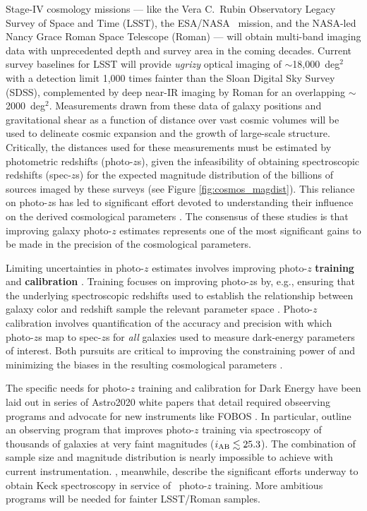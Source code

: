 \documentclass[11pt,a4paper,twoside,onecolumn,openany,final,oldfontcommands]{memoir}
\begin{document}
Stage-IV cosmology missions --- like the Vera C.~Rubin Observatory Legacy Survey of Space and Time (LSST), the ESA/NASA \euclid\ mission, and the NASA-led Nancy Grace Roman Space Telescope (Roman) --- will obtain multi-band imaging data with unprecedented depth and survey area in the coming decades.  Current survey baselines for LSST will provide \textit{ugrizy} optical imaging of $\sim$18,000~deg$^{2}$ with a detection limit 1,000 times fainter than the Sloan Digital Sky Survey (SDSS), complemented by deep near-IR imaging by Roman for an overlapping $\sim$2000~deg$^{2}$.  Measurements drawn from these data of galaxy positions and gravitational shear as a function of distance over vast cosmic volumes will be used to delineate cosmic expansion and the growth of large-scale structure. Critically, the distances used for these measurements must be estimated by photometric redshifts (photo-$z$s), given the infeasibility of obtaining spectroscopic redshifts (spec-$z$s) for the expected magnitude distribution of the billions of sources imaged by these surveys (see Figure \ref{fig:cosmos_magdist}).  This reliance on photo-$z$s has led to significant effort devoted to understanding their influence on the derived cosmological parameters \citep{huterer06, hearin10, newman15, LSSTDESCSRD}.  The consensus of these studies is that improving galaxy photo-$z$ estimates represents one of the most significant gains to be made in the precision of the cosmological parameters.

Limiting uncertainties in photo-$z$ estimates involves improving photo-$z$ \textbf{training} and \textbf{calibration} \citep{newman15}.  Training focuses on improving photo-$z$s by, e.g., ensuring that the underlying spectroscopic redshifts used to establish the relationship between galaxy color and redshift sample the relevant parameter space \citep{masters15, hemmati18}.  Photo-$z$ calibration involves quantification of the accuracy and precision with which photo-$z$s map to spec-$z$s for \textit{all} galaxies used to measure dark-energy parameters of interest.  Both pursuits are critical to improving the constraining power of and minimizing the biases in the resulting cosmological parameters \citep{LSSTDESCSRD}.

The specific needs for photo-$z$ training and calibration for Dark Energy have been laid out in series of Astro2020 white papers that detail required obseerving programs and advocate for new instruments like FOBOS \citep{newman19, hlovek19, mandelbaum19}.  In particular, \citet{newman15, newman19} outline an observing program that improves photo-$z$ training via spectroscopy of thousands of galaxies at very faint magnitudes ($i_{\rm AB} \lesssim 25.3$).  The combination of sample size and magnitude distribution is nearly impossible to achieve with current instrumentation.  \citep{masters19}, meanwhile, describe the significant efforts underway to obtain Keck spectroscopy in service of \euclid\ photo-$z$ training.  More ambitious programs will be needed for fainter LSST/Roman samples.
\end{document}
